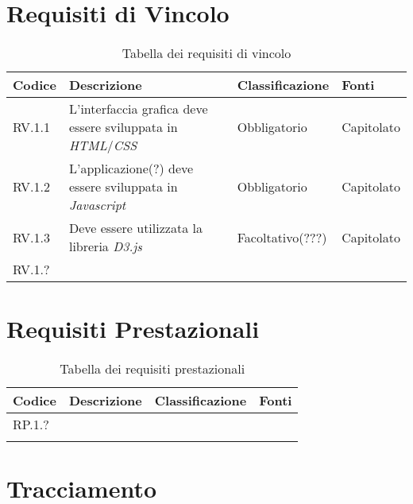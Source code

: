 \section{Requisiti di Vincolo}
\begin{table}[H]
  \centering
  \begin{tabular}{|p{}|p{6cm}|p{3cm}|p{2cm}|}
    \hline
    \rowcolor[HTML]{036400}
    {\color[HTML]{FFFFFF} \textbf{Codice}} & {\color[HTML]{FFFFFF} \textbf{Descrizione}} & {\color[HTML]{FFFFFF} \textbf{Classificazione}} & {\color[HTML]{FFFFFF} \textbf{Fonti}} \\ \hline
    \rowcolor[HTML]{EFEFEF}
    RV.1.1 & L'interfaccia grafica deve essere sviluppata in \textit{HTML}/\textit{CSS} & Obbligatorio & Capitolato \\ \hline
    \rowcolor[HTML]{C0C0C0}
    RV.1.2 & L'applicazione(?) deve essere sviluppata in \textit{Javascript} & Obbligatorio & Capitolato \\ \hline
    \rowcolor[HTML]{EFEFEF}
    RV.1.3 & Deve essere utilizzata la libreria \textit{D3.js} & Facoltativo(???) & Capitolato \\ \hline
    \rowcolor[HTML]{C0C0C0}
    RV.1.? &  &  &  \\ \hline
  \end{tabular}
  \caption{Tabella dei requisiti di vincolo}
\end{table}

\section{Requisiti Prestazionali}
\begin{table}[H]
  \centering
  \begin{tabular}{|p{}|p{6cm}|p{3cm}|p{2cm}|}
    \hline
    \rowcolor[HTML]{036400}
    {\color[HTML]{FFFFFF} \textbf{Codice}} & {\color[HTML]{FFFFFF} \textbf{Descrizione}} & {\color[HTML]{FFFFFF} \textbf{Classificazione}} & {\color[HTML]{FFFFFF} \textbf{Fonti}} \\ \hline
    \rowcolor[HTML]{EFEFEF}
    RP.1.? &  &  &  \\ \hline
    \rowcolor[HTML]{C0C0C0}
    &  &  &  \\ \hline
  \end{tabular}
  \caption{Tabella dei requisiti prestazionali}
\end{table}

\section{Tracciamento}

